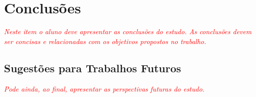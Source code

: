 \chapter{Conclusões}
\label{ch:conclusoes}

\textit{\textcolor{red}{Neste item o aluno deve apresentar as conclusões do estudo. As conclusões devem ser concisas e relacionadas com os objetivos propostos no trabalho.}}

\section{Sugestões para Trabalhos Futuros}
\label{section:sugestoes_trabalhos_futuros}

\textit{\textcolor{red}{Pode ainda, ao final, apresentar as perspectivas futuras do estudo.}}